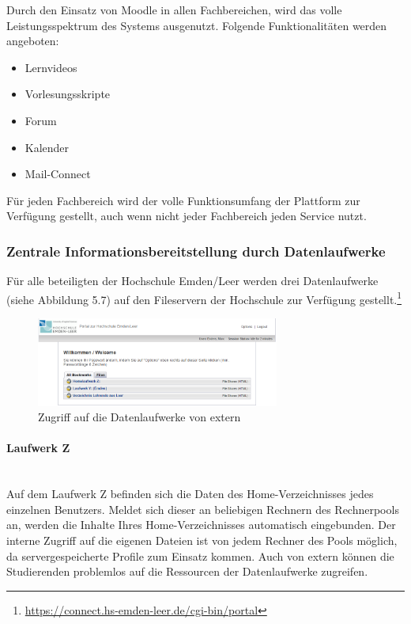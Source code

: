 Durch den Einsatz von Moodle in allen Fachbereichen, wird das volle Leistungsspektrum des Systems ausgenutzt. Folgende Funktionalitäten werden angeboten:
\begin{itemize}
	\item Lernvideos
	\item Vorlesungsskripte
	\item Forum
	\item Kalender
	\item Mail-Connect
\end{itemize}

Für jeden Fachbereich wird der volle Funktionsumfang der Plattform zur Verfügung gestellt, auch wenn nicht jeder Fachbereich jeden Service nutzt. 

\subsubsection{Zentrale Informationsbereitstellung durch Datenlaufwerke}
Für alle beteiligten der Hochschule Emden/Leer werden drei Datenlaufwerke (siehe Abbildung 5.7) auf den Fileservern der Hochschule zur Verfügung gestellt.\footnote{\url{https://connect.hs-emden-leer.de/cgi-bin/portal}}

\begin{figure}[h!]
	\centering
	\includegraphics[width=8cm]{kapitel/gruppe2/bilder/zugriff_auf_laufwerke_extern}
	\caption{Zugriff auf die Datenlaufwerke von extern}
	\label{fig_zugriff_datenlaufwerke_extern}
\end{figure}


\paragraph{Laufwerk Z}\mbox{} \\

Auf dem Laufwerk Z befinden sich die Daten des Home-Verzeichnisses jedes einzelnen Benutzers. Meldet sich dieser an beliebigen Rechnern des Rechnerpools an, werden die Inhalte Ihres Home-Verzeichnisses automatisch eingebunden. Der interne Zugriff auf die eigenen Dateien ist von jedem Rechner des Pools möglich, da servergespeicherte Profile zum Einsatz kommen. Auch von extern können die Studierenden problemlos auf die Ressourcen der Datenlaufwerke zugreifen.

